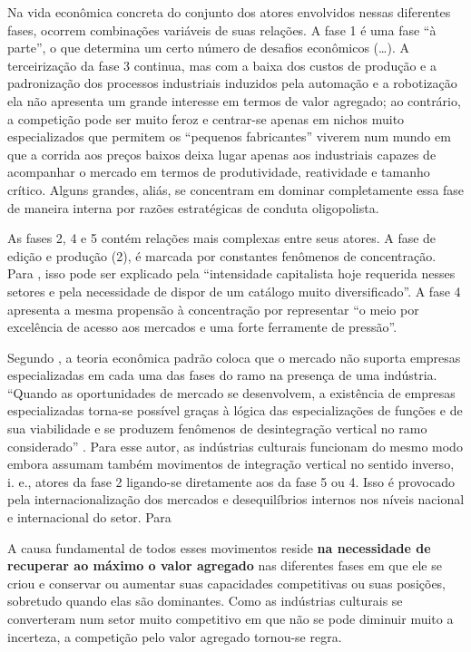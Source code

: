 \documentclass[a4paper, 12pt, openright, oneside, german, french, english, brazil]{abntex2}
\begin{document}
	\begin{citacao}
		Na vida econômica concreta do conjunto dos atores envolvidos nessas diferentes fases, ocorrem combinações variáveis de suas relações. A fase 1 é uma fase ``à parte'', o que determina um certo número de desafios econômicos (\ldots). A terceirização da fase 3 continua, mas com a baixa dos custos de produção e a padronização dos processos industriais induzidos pela automação e a robotização ela não apresenta um grande interesse em termos de valor agregado; ao contrário, a competição pode ser muito feroz e centrar-se apenas em nichos muito especializados que permitem os ``pequenos fabricantes'' viverem num mundo em que a corrida aos preços baixos deixa lugar apenas aos industriais capazes de acompanhar o mercado em termos de produtividade, reatividade e tamanho crítico. Alguns grandes, aliás, se concentram em dominar completamente essa fase de maneira interna por razões estratégicas de conduta oligopolista. \cite[p. 40]{tolila2007cultura}
	\end{citacao}
	
	As fases 2, 4 e 5 contém relações mais complexas entre seus atores. A fase de edição e produção (2), é marcada por constantes fenômenos de concentração. Para , isso pode ser explicado pela ``intensidade capitalista hoje requerida nesses setores e pela necessidade de dispor de um catálogo muito diversificado''. A fase 4 apresenta a mesma propensão à concentração por representar ``o meio por excelência de acesso aos mercados e uma forte ferramente de pressão''. 
	
	Segundo , a teoria econômica padrão coloca que o mercado não suporta empresas especializadas em cada uma das fases do ramo na presença de uma indústria. ``Quando as oportunidades de mercado se desenvolvem, a existência de empresas especializadas torna-se possível graças à lógica das especializações de funções e de sua viabilidade e se produzem fenômenos de desintegração vertical no ramo considerado'' \cite[p. 41]{tolila2007cultura}. Para esse autor, as indústrias culturais funcionam do mesmo modo embora assumam também movimentos de integração vertical no sentido inverso, i. e., atores da fase 2 ligando-se diretamente aos da fase 5 ou 4. Isso é provocado pela internacionalização dos mercados e desequilíbrios internos nos níveis nacional e internacional do setor. Para 
	
	\begin{citacao}
		A causa fundamental de todos esses movimentos reside \textbf{na necessidade de recuperar ao máximo o valor agregado} nas diferentes fases em que ele se criou e conservar ou aumentar suas capacidades competitivas ou suas posições, sobretudo quando elas são dominantes. Como as indústrias culturais se converteram num setor muito competitivo em que não se pode diminuir muito a incerteza, a competição pelo valor agregado tornou-se regra. \cite[p. 42]{tolila2007cultura}
	\end{citacao}
	
\end{document}
